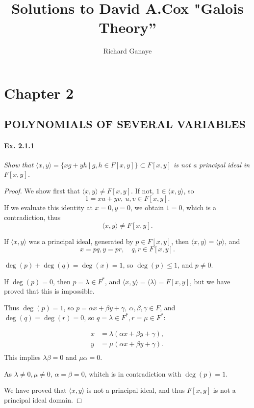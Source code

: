 \documentclass[11pt,a4paper]{article}
\title{Solutions to David A.Cox  "Galois Theory''}
\author{Richard Ganaye}
\begin{document}
\section{Chapter 2}

\subsection{POLYNOMIALS OF SEVERAL VARIABLES}
\paragraph{Ex. 2.1.1}

{\it Show that $\langle x, y \rangle = \{xg+yh\ \vert\  g,h \in F[x,y]\} \subset F[x,y]$ is not a principal ideal in $F[x,y]$.
}

\begin{proof}
We show first that $\langle x,y \rangle \neq F[x,y]$. If not, $1 \in \langle x,y \rangle$, so
$$1 = x u + y v,\ u,v \in F[x,y] .$$
If we evaluate this identity at  $x =0,y=0$, we obtain $1=0$, which is a contradiction, thus
$$\langle x,y \rangle \neq F[x,y].$$

If $\langle x,y \rangle$ was a principal ideal, generated by  $p \in F[x,y]$, then $\langle x,y \rangle = \langle p \rangle$, and
$$x = pq, y = pr, \quad q,r \in F[x,y].$$

$\deg(p)+ \deg(q) = \deg(x) = 1$, so $\deg(p)\leq 1$, and $p\neq 0$.

If $\deg(p)=0$, then $p =\lambda \in F^*$, and $\langle x,y \rangle = \langle \lambda \rangle = F[x,y]$, but we have proved that this is impossible.

Thus $\deg(p)=1$, so $p = \alpha x + \beta y + \gamma,\  \alpha,\beta,\gamma \in F$, and $\deg(q) = \deg(r)=0$, so $q = \lambda \in F^*, r = \mu \in F^*$:

\begin{align*}
x &= \lambda (\alpha x + \beta y + \gamma),\\
y &= \mu (\alpha x + \beta y + \gamma).\\
\end{align*}
This implies $\lambda \beta = 0$ and $\mu \alpha = 0$.

As $\lambda \neq 0, \mu \neq 0$, $\alpha = \beta = 0$, whitch is in contradiction with $\deg(p) = 1$.

We have proved that $\langle x,y \rangle$ is not a principal ideal, and thus $F[x,y]$ is not a principal ideal domain.
\end{proof}
\end{document}
